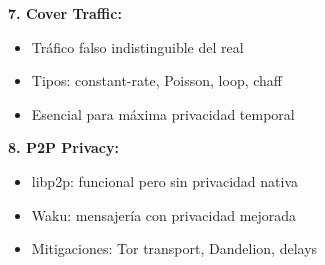 \documentclass[11pt,a4paper,twoside]{book}
\theoremstyle{definition}
\theoremstyle{remark}
\begin{document}
\begin{keyidea}
\textbf{7. Cover Traffic:}
\begin{itemize}
    \item Tráfico falso indistinguible del real
    \item Tipos: constant-rate, Poisson, loop, chaff
    \item Esencial para máxima privacidad temporal
\end{itemize}

\textbf{8. P2P Privacy:}
\begin{itemize}
    \item libp2p: funcional pero sin privacidad nativa
    \item Waku: mensajería con privacidad mejorada
    \item Mitigaciones: Tor transport, Dandelion, delays
\end{itemize}
\end{keyidea}
\end{document}
